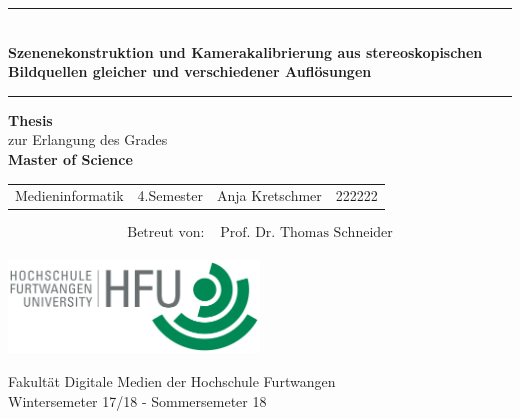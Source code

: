 \begin{titlepage}
\thispagestyle{empty}

\begin{center}
	\enlargethispage{3\baselineskip}
	\hrule
	
	\begin{center} \LARGE \textbf{\\Szenenekonstruktion und Kamerakalibrierung aus stereoskopischen Bildquellen gleicher und verschiedener Auflösungen}
	\end{center}
	
	\vspace{0.5cm}
	
	\hrule
	
	\vspace{2.5cm}
	
	{\Large \textbf{Thesis}\\ zur Erlangung des Grades\\[2ex]
	\textbf{Master of Science}}
	
	\vspace{3cm}
	
	\begin{tabular}{l l l l}
		Medieninformatik &4.Semester &Anja Kretschmer &222222 \vspace{0.2cm} \\	
	\end{tabular}
	
	\vspace{1cm}
	
	\begin{align*}
	\text{Betreut von: }  &\text{Prof. Dr. Thomas Schneider}\\
	\end{align*}	
	
	\vspace{1.0cm}
	
	
	\vspace{1.5cm}
	\includegraphics[width=0.5\textwidth]{./images/hfu_logo.png}

	Fakultät Digitale Medien der Hochschule Furtwangen\\[1ex]
	Wintersemeter 17/18 - Sommersemeter 18

\end{center}

\end{titlepage}